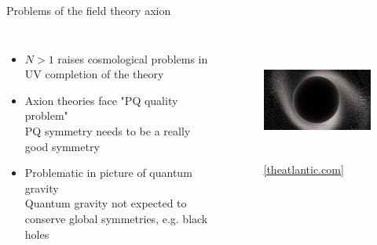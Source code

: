 \documentclass[aspectratio=1610, 9pt]{beamer}
\begin{document}
\begin{frame}{Problems of the field theory axion}
  \begin{columns}
    \begin{itemize}
      \item $N>1$ raises cosmological problems in UV completion of the theory
      \item Axion theories face "PQ quality problem" \\
      \rightarrow PQ symmetry needs to be a really good symmetry
      \item Problematic in picture of quantum gravity \\
      \rightarrow Quantum gravity not expected to conserve global symmetries, e.g. black holes
    \end{itemize}
    \begin{figure}
    \includegraphics[height=4cm]{images/hole.png}
    \caption{\footnotesize \href{https://www.theatlantic.com/science/archive/2021/03/black-hole-cygnus-suprise/618049/}{{[theatlantic.com]}}}
    \end{figure}
  \end{columns}
\end{frame}
\end{document}
